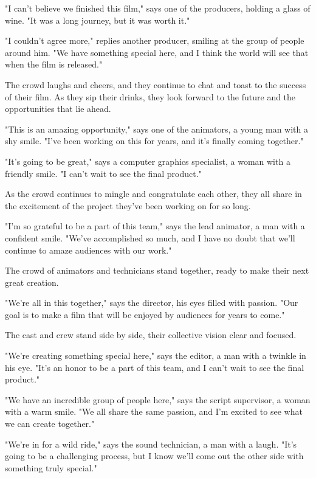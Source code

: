 \documentclass[smalldemyvopaper,11pt,twoside,onecolumn,openright,extrafontsizes]{memoir}
\begin{document}
"I can't believe we finished this film," says one of the producers, holding a glass of wine. "It was a long journey, but it was worth it."\par
"I couldn't agree more," replies another producer, smiling at the group of people around him. "We have something special here, and I think the world will see that when the film is released."\par
The crowd laughs and cheers, and they continue to chat and toast to the success of their film. As they sip their drinks, they look forward to the future and the opportunities that lie ahead.\par
"This is an amazing opportunity," says one of the animators, a young man with a shy smile. "I've been working on this for years, and it's finally coming together."\par
"It's going to be great," says a computer graphics specialist, a woman with a friendly smile. "I can't wait to see the final product."\par
As the crowd continues to mingle and congratulate each other, they all share in the excitement of the project they've been working on for so long.\par
"I'm so grateful to be a part of this team," says the lead animator, a man with a confident smile. "We've accomplished so much, and I have no doubt that we'll continue to amaze audiences with our work."\par
The crowd of animators and technicians stand together, ready to make their next great creation.\par
"We're all in this together," says the director, his eyes filled with passion. "Our goal is to make a film that will be enjoyed by audiences for years to come."\par
The cast and crew stand side by side, their collective vision clear and focused.\par
"We're creating something special here," says the editor, a man with a twinkle in his eye. "It's an honor to be a part of this team, and I can't wait to see the final product."\par
"We have an incredible group of people here," says the script supervisor, a woman with a warm smile. "We all share the same passion, and I'm excited to see what we can create together."\par
"We're in for a wild ride," says the sound technician, a man with a laugh. "It's going to be a challenging process, but I know we'll come out the other side with something truly special."\par
\end{document}
